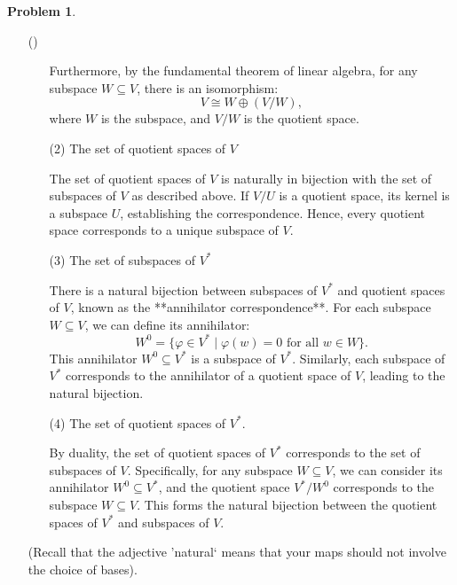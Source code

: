\documentclass[12pt]{article}
\theoremstyle{definition}
\newtheorem{problem}{Problem}
\newcounter{subq}[problem]
\newenvironment{subproblem}
{\refstepcounter{subq} \begin{itemize} \item[(\alph{subq})]}
{\end{itemize} \medskip}
\begin{document}
\begin{problem}
\begin{subproblem}
\begin{enumerate}
\begin{solution}
                Furthermore, by the fundamental theorem of linear algebra, for any subspace $W \subseteq V$, there is an isomorphism:
                \[
                V \cong W \oplus (V/W),
                \]
                where $W$ is the subspace, and $V/W$ is the quotient space.
            \end{solution}
            \item [(2)] The set of quotient spaces of $V$\\
            \begin{solution}
                The set of quotient spaces of $V$ is naturally in bijection with the set of subspaces of $V$ as described above. If $V/U$ is a quotient space, its kernel is a subspace $U$, establishing the correspondence. Hence, every quotient space corresponds to a unique subspace of $V$.
            \end{solution}
            \item [(3)] The set of subspaces of $V^*$\\
            \begin{solution}
                There is a natural bijection between subspaces of $V^*$ and quotient spaces of $V$, known as the **annihilator correspondence**. For each subspace $W \subseteq V$, we can define its annihilator:
                \[
                W^0 = \{\varphi \in V^* \mid \varphi(w) = 0 \text{ for all } w \in W\}.
                \]
                This annihilator $W^0 \subseteq V^*$ is a subspace of $V^*$. Similarly, each subspace of $V^*$ corresponds to the annihilator of a quotient space of $V$, leading to the natural bijection.
            \end{solution}
            \item [(4)] The set of quotient spaces of $V^*$.\\
            \begin{solution}
                By duality, the set of quotient spaces of $V^*$ corresponds to the set of subspaces of $V$. Specifically, for any subspace $W \subseteq V$, we can consider its annihilator $W^0 \subseteq V^*$, and the quotient space $V^*/W^0$ corresponds to the subspace $W \subseteq V$. This forms the natural bijection between the quotient spaces of $V^*$ and subspaces of $V$.
            \end{solution}
        \end{enumerate}
        (Recall that the adjective 'natural` means that your maps should not involve the choice of bases).
    \end{subproblem}


\end{problem}
\end{document}
